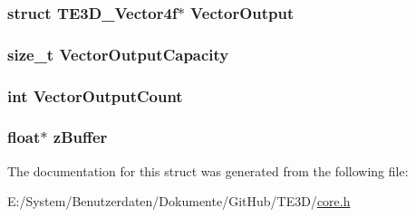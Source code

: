 \hypertarget{struct_t_e3_d___pipeline_a484b514c3272f2ebd29fadb67c976cfb}{
\subsubsection[{Vector\-Output}]{\setlength{\rightskip}{0pt plus 5cm}struct {\bf T\-E3\-D\-\_\-\-Vector4f}$\ast$ Vector\-Output}}\label{struct_t_e3_d___pipeline_a484b514c3272f2ebd29fadb67c976cfb}
\hypertarget{struct_t_e3_d___pipeline_a6372ef48448fcdf753e0ae30212feef6}{
\subsubsection[{Vector\-Output\-Capacity}]{\setlength{\rightskip}{0pt plus 5cm}size\-\_\-t Vector\-Output\-Capacity}}\label{struct_t_e3_d___pipeline_a6372ef48448fcdf753e0ae30212feef6}
\hypertarget{struct_t_e3_d___pipeline_ae10862edd986d72d19291e85965282f6}{
\subsubsection[{Vector\-Output\-Count}]{\setlength{\rightskip}{0pt plus 5cm}int Vector\-Output\-Count}}\label{struct_t_e3_d___pipeline_ae10862edd986d72d19291e85965282f6}
\hypertarget{struct_t_e3_d___pipeline_a627615edd455b5791a70b97c531d8942}{
\subsubsection[{z\-Buffer}]{\setlength{\rightskip}{0pt plus 5cm}float$\ast$ z\-Buffer}}\label{struct_t_e3_d___pipeline_a627615edd455b5791a70b97c531d8942}


The documentation for this struct was generated from the following file\-:\begin{DoxyCompactItemize}
\item 
E\-:/\-System/\-Benutzerdaten/\-Dokumente/\-Git\-Hub/\-T\-E3\-D/\hyperlink{core_8h}{core.\-h}\end{DoxyCompactItemize}
